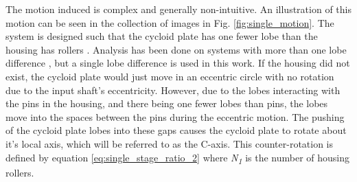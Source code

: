 The motion induced is complex and generally non-intuitive. An illustration of this motion can be seen in the collection of images in Fig. \ref{fig:single_motion}. The system is designed such that the cycloid plate has one fewer lobe than the housing has rollers \cite{ref:pollitt}. Analysis has been done on systems with more than one lobe difference \cite{ref:hsieh_traditional}, but a single lobe difference is used in this work. If the housing did not exist, the cycloid plate would just move in an eccentric circle with no rotation due to the input shaft's eccentricity. However, due to the lobes interacting with the pins in the housing, and there being one fewer lobes than pins, the lobes move into the spaces between the pins during the eccentric motion. The pushing of the cycloid plate lobes into these gaps causes the cycloid plate to rotate about it's local axis, which will be referred to as the C-axis. This counter-rotation is defined by equation \ref{eq:single_stage_ratio_2} \cite{ref:on_the_lobe} where \textit{N\textsubscript{1}} is the number of housing rollers.

